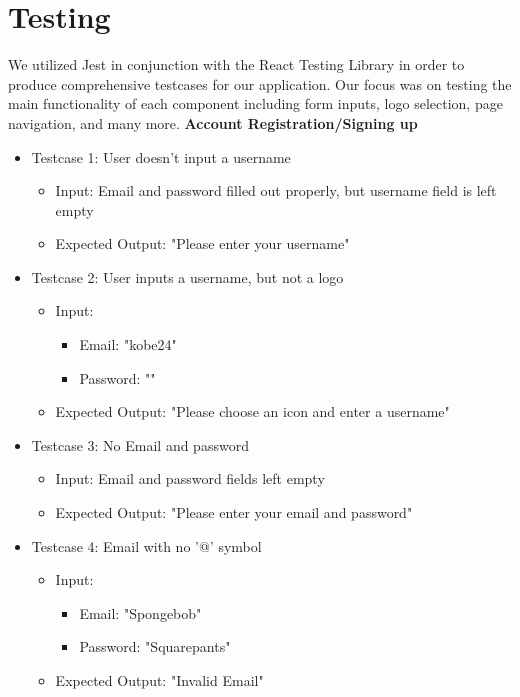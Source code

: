 \section{Testing}
We utilized Jest in conjunction with the React Testing Library in order to produce comprehensive testcases for our application. Our focus was on testing the main functionality of each component including form inputs, logo selection, page navigation, and many more.
\noindent
\textbf{Account Registration/Signing up}
\begin{itemize}
    \item Testcase 1: User doesn't input a username
    \begin{itemize}
        \item Input: Email and password filled out properly, but username field is left empty
        \item Expected Output: "Please enter your username"
    \end{itemize}

    \item Testcase 2: User inputs a username, but not a logo
    \begin{itemize}
        \item Input:
            \begin{itemize}
                \item Email: "kobe24"
                \item Password: ""
            \end{itemize}
        \item Expected Output: "Please choose an icon and enter a username"
    \end{itemize}

    \item Testcase 3: No Email and password
    \begin{itemize}
        \item Input: Email and password fields left empty
        \item Expected Output: "Please enter your email and password"
    \end{itemize}

    \item Testcase 4: Email with no '@' symbol
    \begin{itemize}
        \item Input:
            \begin{itemize}
                \item Email: "Spongebob"
                \item Password: "Squarepants"
            \end{itemize}
        \item Expected Output: "Invalid Email"
    \end{itemize}


\end{itemize}
